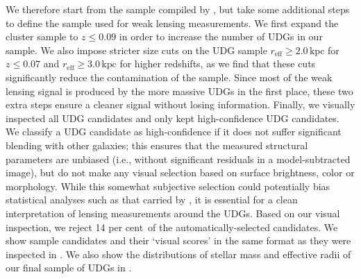 \documentclass[usenatbib,fleqn]{mnras}
\def\percent{ per cent}
\def\reff{r_\mathrm{eff}}
\begin{document}
We therefore start from the sample compiled by \cite{vdburg16}, but take some additional steps to define the sample used for weak lensing measurements. We first expand the cluster sample to $z\leq0.09$ in order to increase the number of UDGs in our sample. We also impose stricter size cuts on the UDG sample $\reff\geq2.0\,\mathrm{kpc}$ for $z\leq0.07$ and $\reff\geq3.0\,\mathrm{kpc}$ for higher redshifts, as we find that these cuts significantly reduce the contamination of the sample. Since most of the weak lensing signal is produced by the more massive UDGs in the first place, these two extra steps ensure a cleaner signal without losing information. Finally, we visually inspected all UDG candidates and only kept high-confidence UDG candidates. We classify a UDG candidate as high-confidence if it does not suffer significant blending with other galaxies; this ensures that the measured structural parameters are unbiased (i.e., without significant residuals in a model-subtracted image), but do not make any visual selection based on surface brightness, color or morphology. While this somewhat subjective selection could potentially bias statistical analyses such as that carried by \cite{vdburg16}, it is essential for a clean interpretation of lensing measurements around the UDGs. Based on our visual inspection, we reject 14\percent\ of the automatically-selected candidates. We show sample candidates and their `visual scores' in the same format as they were inspected in . We also show the distributions of stellar mass and effective radii of our final sample of UDGs in .
\end{document}

